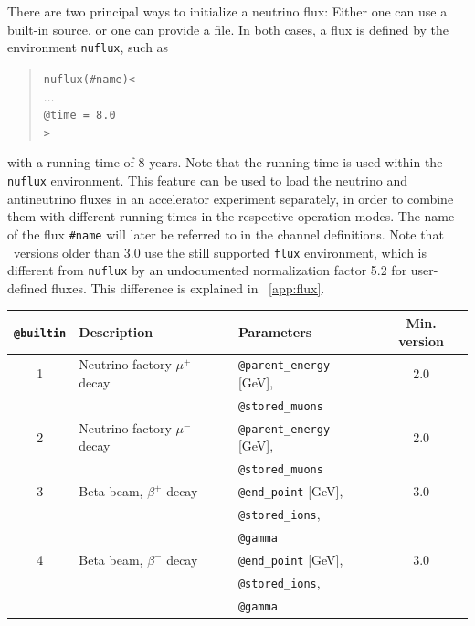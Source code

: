 There are two principal ways to initialize a neutrino flux: 
Either one can use 
a built-in source, or one can provide a file. In both cases,
a flux is defined by the environment {\tt nuflux}, such as
\begin{quote}
  {\tt nuflux(\#name)<\\
\tb $\ldots$\\
\tb @time = 8.0 \\
>}
\end{quote}
with a running time of $8$ years. Note that the running time is used within
the {\tt nuflux} environment. This feature can be used to load the neutrino
and antineutrino fluxes in an accelerator experiment separately, in order
to combine them with different running times in the respective operation modes.
The name of the flux {\tt \#name} will later be referred to in the channel definitions. Note that \GLOBES\ versions older than 3.0 use the still supported {\tt flux} environment, which is different from {\tt nuflux} by an undocumented normalization factor 5.2 for user-defined fluxes. This difference is explained in \App~\ref{app:flux}.


\begin{table}[t]
\begin{center}
\begin{tabular}{|cllc|}
\hline
{\tt @builtin} & Description & Parameters & Min. version \\
\hline
1 & Neutrino factory $\mu^+$ decay & {\tt @parent\_energy} [GeV], & 2.0 \\
& & {\tt @stored\_muons} &  \\
2 & Neutrino factory $\mu^-$ decay & {\tt @parent\_energy} [GeV], & 2.0 \\
& & {\tt @stored\_muons} &  \\
3 & Beta beam, $\beta^+$ decay & {\tt @end\_point} [GeV], & 3.0 \\
& & {\tt @stored\_ions}, &  \\
& & {\tt @gamma} & \\
4 & Beta beam, $\beta^-$ decay & {\tt @end\_point} [GeV], & 3.0 \\
& & {\tt @stored\_ions}, &  \\
& & {\tt @gamma} & \\
\hline
\end{tabular}
\end{center}
\end{table}

